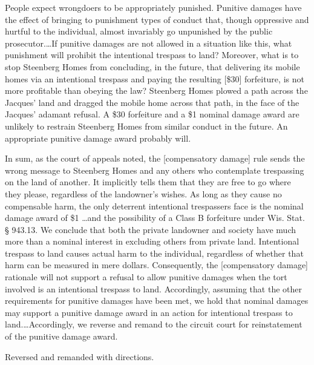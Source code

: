 People expect wrongdoers to be appropriately punished. Punitive damages have
the effect of bringing to punishment types of conduct that, though oppressive
and hurtful to the individual, almost invariably go unpunished by the public
prosecutor.\ldots If punitive damages are not allowed in a situation like
this, what punishment will prohibit the intentional trespass to land? Moreover,
what is to stop Steenberg Homes from concluding, in the future, that delivering
its mobile homes via an intentional trespass and paying the resulting [\$30]
forfeiture, is not more profitable than obeying the law? Steenberg Homes plowed
a path across the Jacques' land and dragged the mobile home across that path,
in the face of the Jacques' adamant refusal. A \$30 forfeiture and a \$1
nominal damage award are unlikely to restrain Steenberg Homes from similar
conduct in the future. An appropriate punitive damage award probably will.

In sum, as the court of appeals noted, the [compensatory damage] rule sends the
wrong message to Steenberg Homes and any others who contemplate trespassing on
the land of another. It implicitly tells them that they are free to go where
they please, regardless of the landowner's wishes. As long as they cause no
compensable harm, the only deterrent intentional trespassers face is the
nominal damage award of \$1 \ldots and the possibility of a Class B forfeiture
under Wis. Stat. {\S} 943.13. We conclude that both the private landowner and
society have much more than a nominal interest in excluding others from private
land. Intentional trespass to land causes actual harm to the individual,
regardless of whether that harm can be measured in mere dollars. Consequently,
the [compensatory damage] rationale will not support a refusal to allow
punitive damages when the tort involved is an intentional trespass to land.
Accordingly, assuming that the other requirements for punitive damages have
been met, we hold that nominal damages may support a punitive damage award in
an action for intentional trespass to land.\ldots Accordingly, we reverse and
remand to the circuit court for reinstatement of the punitive damage award.

Reversed and remanded with directions.

